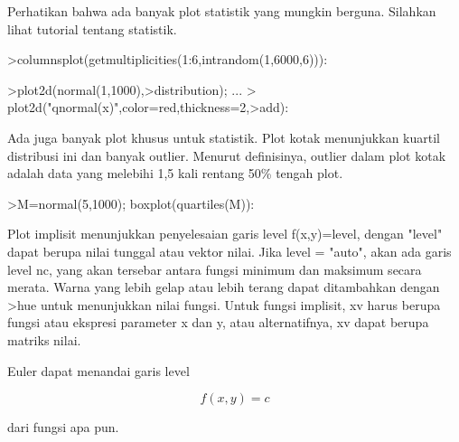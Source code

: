 \documentclass{article}
\begin{document}
\begin{eulernotebook}
\begin{eulercomment}
\begin{eulercomment}
\begin{eulercomment}
\begin{eulercomment}
\begin{eulercomment}
\begin{eulercomment}
\begin{eulercomment}
\begin{eulercomment}
\begin{eulercomment}
\begin{eulercomment}
\begin{eulercomment}
\begin{eulercomment}
\begin{eulercomment}
Perhatikan bahwa ada banyak plot statistik yang mungkin berguna.
Silahkan lihat tutorial tentang statistik.
\end{eulercomment}
\begin{eulerprompt}
>columnsplot(getmultiplicities(1:6,intrandom(1,6000,6))):
\end{eulerprompt}
\begin{eulerprompt}
>plot2d(normal(1,1000),>distribution); ...
>  plot2d("qnormal(x)",color=red,thickness=2,>add):
\end{eulerprompt}
\begin{eulercomment}
Ada juga banyak plot khusus untuk statistik. Plot kotak menunjukkan
kuartil distribusi ini dan banyak outlier. Menurut definisinya,
outlier dalam plot kotak adalah data yang melebihi 1,5 kali rentang
50\% tengah plot.
\end{eulercomment}
\begin{eulerprompt}
>M=normal(5,1000); boxplot(quartiles(M)):
\end{eulerprompt}
\begin{eulercomment}
Plot implisit menunjukkan penyelesaian garis level f(x,y)=level,
dengan "level" dapat berupa nilai tunggal atau vektor nilai. Jika
level = "auto", akan ada garis level nc, yang akan tersebar antara
fungsi minimum dan maksimum secara merata. Warna yang lebih gelap atau
lebih terang dapat ditambahkan dengan \textgreater{}hue untuk menunjukkan nilai
fungsi. Untuk fungsi implisit, xv harus berupa fungsi atau ekspresi
parameter x dan y, atau alternatifnya, xv dapat berupa matriks nilai.

Euler dapat menandai garis level

\end{eulercomment}
\begin{eulerformula}
\[
f(x,y) = c
\]
\end{eulerformula}
\begin{eulercomment}
dari fungsi apa pun.


\end{eulercomment}
\end{eulercomment}
\end{eulercomment}
\end{eulercomment}
\end{eulercomment}
\end{eulercomment}
\end{eulercomment}
\end{eulercomment}
\end{eulercomment}
\end{eulercomment}
\end{eulercomment}
\end{eulercomment}
\end{eulercomment}
\end{eulernotebook}
\end{document}
